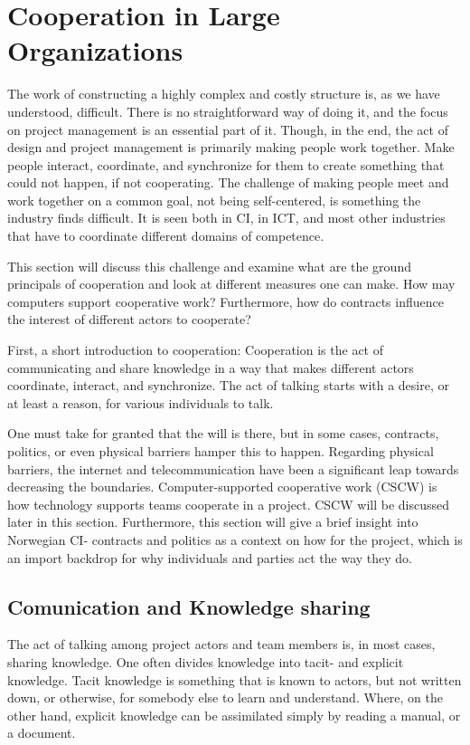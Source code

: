 \section{Cooperation in Large Organizations}
The work of constructing a highly complex and costly structure is, as we have understood, difficult. There is no straightforward way of doing it, and the focus on project management is an essential part of it. Though, in the end, the act of design and project management is primarily making people work together. Make people interact, coordinate, and synchronize for them to create something that could not happen, if not cooperating. The challenge of making people meet and work together on a common goal, not being self-centered, is something the industry finds difficult. It is seen both in CI, in ICT, and most other industries that have to coordinate different domains of competence. 

This section will discuss this challenge and examine what are the ground principals of cooperation and look at different measures one can make. How may computers support cooperative work? Furthermore, how do contracts influence the interest of different actors to cooperate? 

First, a short introduction to cooperation: Cooperation is the act of communicating and share knowledge in a way that makes different actors coordinate, interact, and synchronize. The act of talking starts with a desire, or at least a reason, for various individuals to talk. 

One must take for granted that the will is there, but in some cases, contracts, politics, or even physical barriers hamper this to happen. Regarding physical barriers, the internet and telecommunication have been a significant leap towards decreasing the boundaries. Computer-supported cooperative work (CSCW) is how technology supports teams cooperate in a project. CSCW will be discussed later in this section. Furthermore, this section will give a brief insight into Norwegian CI- contracts and politics as a context on how for the project, which is an import backdrop for why individuals and parties act the way they do. 

\subsection{Comunication and Knowledge sharing}
The act of talking among project actors and team members is, in most cases, sharing knowledge. One often divides knowledge into tacit- and explicit knowledge. Tacit knowledge is something that is known to actors, but not written down, or otherwise, for somebody else to learn and understand. Where, on the other hand, explicit knowledge can be assimilated simply by reading a manual, or a document. 

